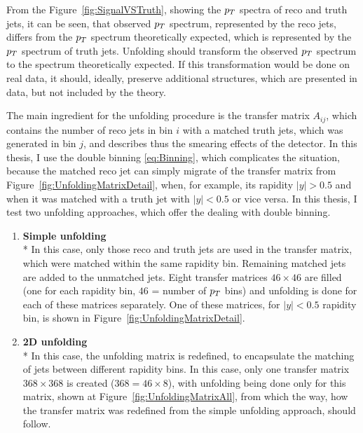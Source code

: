 From the Figure~\ref{fig:SignalVSTruth}, showing the $p_{T}$ spectra of reco and
truth jets, it can be seen, that observed $p_{T}$ spectrum, represented by the reco jets,
differs from the $p_{T}$ spectrum theoretically expected, which is represented by
the $p_{T}$ spectrum of truth jets. Unfolding should transform the observed $p_{T}$
spectrum to the spectrum theoretically expected. If this transformation would be
done on real data, it should, ideally, preserve additional structures, which are
presented in data, but not included by the theory.

The main ingredient for the unfolding procedure is the transfer matrix $A_{ij}$,
which contains the number of reco jets in bin $i$ with a matched truth jets,
which was generated in bin $j$, and describes thus the smearing effects of the
detector. In this thesis, I use the double binning \eqref{eq:Binning}, which
complicates the situation, because the matched reco jet can simply migrate of the
transfer matrix from Figure~\ref{fig:UnfoldingMatrixDetail}, when, for example,
its rapidity $|y|>0.5$ and when it was matched with a truth jet with $|y|<0.5$ or
vice versa. In this thesis, I test two unfolding approaches, which offer
the dealing with double binning.

\begin{enumerate}
  \item \textbf{Simple unfolding}
  \\*
    In this case, only those reco and truth jets are used in the transfer
    matrix, which were matched within the same rapidity bin. Remaining matched
    jets are added to the unmatched jets. Eight transfer matrices $46 \times
    46$ are filled (one for each rapidity bin, $46$ = number of $p_{T}$ bins) and
    unfolding is done for each of these matrices separately. One of these
    matrices, for $|y|<0.5$ rapidity bin, is shown in
    Figure~\ref{fig:UnfoldingMatrixDetail}.

  \item \textbf{2D unfolding}
  \\*
    In this case, the unfolding matrix is redefined, to encapsulate the matching
    of jets between different rapidity bins. In this case, only one transfer
    matrix $368 \times 368$ is created ($368 = 46 \times 8$), with unfolding being
    done only for this matrix, shown at Figure~\ref{fig:UnfoldingMatrixAll}, from which
    the way, how the transfer matrix was redefined from the simple unfolding
    approach, should follow. 
\end{enumerate}

